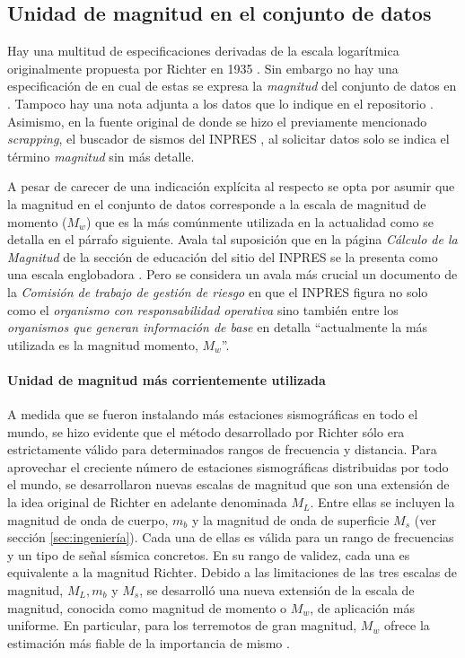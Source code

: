 \documentclass[a4paper]{report}
\begin{document}
\subsection{Unidad de magnitud en el conjunto de datos}\label{sec:magnitud}
Hay una multitud de especificaciones derivadas de la escala logarítmica originalmente propuesta por Richter en 1935 \cite[sección 4.2.3]{fowler_solid_1990}.
Sin embargo no hay una especificación de en cual de estas se expresa la \emph{magnitud} del conjunto de datos en \cite{daniela_parada_ic-datasets-docencia_nodate}.
Tampoco hay una nota adjunta a los datos que lo indique en el repositorio \cite{daniela_parada_sismos-arg_nodate}. 
Asimismo, en la fuente original de donde se hizo el previamente mencionado \emph{scrapping}, el buscador de sismos del INPRES \cite{noauthor_buscador_nodate}, al solicitar datos solo se indica el término \emph{magnitud} sin más detalle.

A pesar de carecer de una indicación explícita al respecto se opta por asumir que la magnitud en el conjunto de datos corresponde a la escala de magnitud de momento (\(M_w\)) que es la más comúnmente utilizada en la actualidad como se detalla en el párrafo siguiente.
Avala tal suposición que en la página \emph{Cálculo de la Magnitud} de la sección de educación del sitio del INPRES se la presenta como una escala englobadora \cite{noauthor_calculo_2022}.
Pero se considera un avala más crucial un documento de la \emph{Comisión de trabajo de gestión de riesgo} en que el INPRES figura no solo como el \emph{organismo con responsabilidad operativa} sino también entre los \emph{organismos que generan información de base} en \cite[anéxo X]{noauthor_sismos_2015} detalla ``actualmente la más utilizada es la magnitud momento, \(M_w\)''.  


\paragraph{Unidad de magnitud más corrientemente utilizada}
A medida que se fueron instalando más estaciones sismográficas en todo el mundo, se hizo evidente que el método desarrollado por Richter sólo era estrictamente válido para determinados rangos de frecuencia y distancia.
Para aprovechar el creciente número de estaciones sismográficas distribuidas por todo el mundo, se desarrollaron nuevas escalas de magnitud que son una extensión de la idea original de Richter en adelante denominada \(M_L\).
Entre ellas se incluyen la magnitud de onda de cuerpo, \(m_b\) y la magnitud de onda de superficie \(M_s\) (ver sección \ref{sec:ingeniería}).
Cada una de ellas es válida para un rango de frecuencias y un tipo de señal sísmica concretos.
En su rango de validez, cada una es equivalente a la magnitud Richter.
Debido a las limitaciones de las tres escalas de magnitud, \(M_L, m_b\) y \(M_s\), se desarrolló una nueva extensión de la escala de magnitud, conocida como magnitud de momento o \(M_w\), de aplicación más uniforme.
En particular, para los terremotos de gran magnitud, \(M_w\) ofrece la estimación más fiable de la importancia de mismo \cite{noauthor_moment_nodate}.
	
\end{document}
